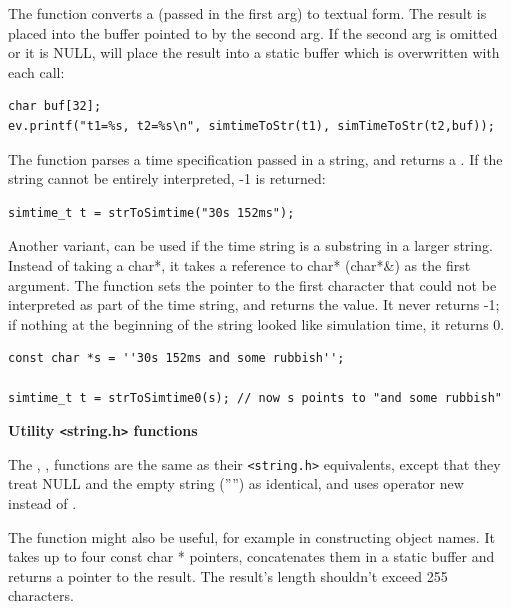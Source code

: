 The  function converts a 
(passed in the first arg) to textual form. The result is placed into
the buffer pointed to by the second arg. If the second arg is omitted
or it is NULL,  will place the result into a
static buffer which is overwritten with each call:

\begin{Verbatim}
char buf[32];
ev.printf("t1=%s, t2=%s\n", simtimeToStr(t1), simTimeToStr(t2,buf));
\end{Verbatim}


The  function parses a time specification passed
in a string, and returns a . If the string cannot
be entirely interpreted, -1 is returned:

\begin{Verbatim}
simtime_t t = strToSimtime("30s 152ms");
\end{Verbatim}

Another variant,  can be used if the time
string is a substring in a larger string. Instead of taking a char*,
it takes a reference to char* (char*\&) as the first argument.  The
function sets the pointer to the first character that could not be
interpreted as part of the time string, and returns the value. It
never returns -1; if nothing at the beginning of the string looked
like simulation time, it returns 0.

\begin{Verbatim}
const char *s = ''30s 152ms and some rubbish'';

simtime_t t = strToSimtime0(s); // now s points to "and some rubbish"
\end{Verbatim}

\textbf{Utility \texttt{<}string.h\texttt{>} functions}

\begin{sloppypar}
The , , 
functions are the same as their \texttt{<string.h>} equivalents,
except that they treat NULL and the empty string ('''') as identical,
and  uses operator new instead of
.
\end{sloppypar}

The  function might also be useful, for example
in constructing object names. It takes up to four const char *
pointers, concatenates them in a static buffer and returns a pointer
to the result. The result's length shouldn't exceed 255 characters.





